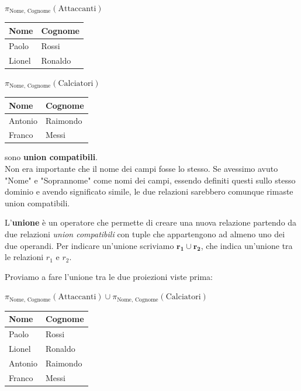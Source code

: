 \documentclass[11pt, a4paper, titlepage, oneside]{scrbook}
\begin{document}
\begin{minipage}[c]{0.45\textwidth}
\begin{center}
    $\pi_{\text{Nome, Cognome}}(\text{Attaccanti})$ 

\begin{tabular}{|l|l|}
\hline
\textbf{Nome} & \textbf{Cognome}  \\ \hline
Paolo   & Rossi   \\
Lionel  & Ronaldo  \\ \hline
\end{tabular}
\end{center}
\end{minipage}\hfill
\begin{minipage}[c]{0.45\textwidth}
\begin{center}
    $\pi_{\text{Nome, Cognome}}(\text{Calciatori})$ 

\begin{tabular}{|l|l|}
\hline
\textbf{Nome} & \textbf{Cognome} \\ \hline
Antonio   & Raimondo    \\
Franco  & Messi \\ \hline
\end{tabular}
\end{center}
\end{minipage}

sono \textbf{union compatibili}. \\
\NB Non era importante che il nome dei campi fosse lo stesso. Se avessimo avuto "Nome" e "Soprannome" come nomi dei campi, essendo definiti questi sullo stesso dominio e avendo significato simile, le due relazioni sarebbero comunque rimaste union compatibili.

\begin{Definizione}[Unione]
\label{def-unione}
L'\textbf{unione} è un operatore che permette di creare una nuova relazione partendo da due relazioni \textit{union compatibili} con tuple che appartengono ad almeno uno dei due operandi. Per indicare un'unione scriviamo $\bm{r_1 \cup r_2}$, che indica un'unione tra le relazioni $r_1$ e $r_2$.
\end{Definizione}

Proviamo a fare l'unione tra le due proiezioni viste prima:

\begin{center}
    $\pi_{\text{Nome, Cognome}}(\text{Attaccanti}) \cup \pi_{\text{Nome, Cognome}}(\text{Calciatori})$ 

\begin{tabular}{|l|l|}
\hline
\textbf{Nome} & \textbf{Cognome} \\ \hline
Paolo   & Rossi   \\
Lionel  & Ronaldo  \\ 
Antonio & Raimondo    \\
Franco  & Messi \\ \hline
\end{tabular}
\end{center}
\end{document}
